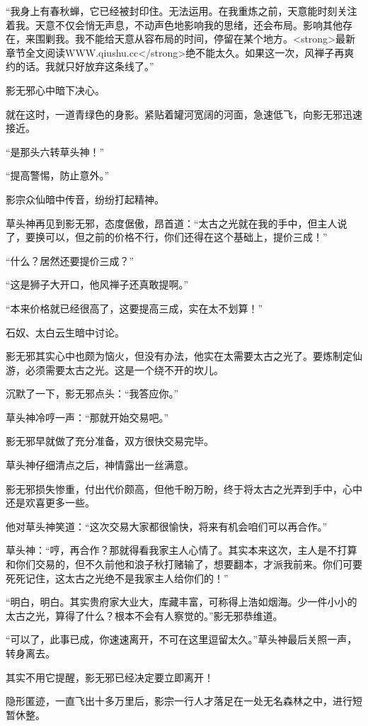 \begin{this_body}
“我身上有春秋蝉，它已经被封印住。无法运用。在我重炼之前，天意能时刻关注着我。天意不仅会悄无声息，不动声色地影响我的思绪，还会布局。影响其他存在，来围剿我。我不能给天意从容布局的时间，停留在某个地方。<strong>最新章节全文阅读WWW.qiushu.cc</strong>绝不能太久。如果这一次，风禅子再爽约的话。我就只好放弃这条线了。”

影无邪心中暗下决心。

就在这时，一道青绿色的身影。紧贴着罐河宽阔的河面，急速低飞，向影无邪迅速接近。

“是那头六转草头神！”

“提高警惕，防止意外。”

影宗众仙暗中传音，纷纷打起精神。

草头神再见到影无邪，态度倨傲，昂首道：“太古之光就在我的手中，但主人说了，要换可以，但之前的价格不行，你们还得在这个基础上，提价三成！”

“什么？居然还要提价三成？”

“这是狮子大开口，他风禅子还真敢提啊。”

“本来价格就已经很高了，这要提高三成，实在太不划算！”

石奴、太白云生暗中讨论。

影无邪其实心中也颇为恼火，但没有办法，他实在太需要太古之光了。要炼制定仙游，必须需要太古之光。这是一个绕不开的坎儿。

沉默了一下，影无邪点头：“我答应你。”

草头神冷哼一声：“那就开始交易吧。”

影无邪早就做了充分准备，双方很快交易完毕。

草头神仔细清点之后，神情露出一丝满意。

影无邪损失惨重，付出代价颇高，但他千盼万盼，终于将太古之光弄到手中，心中还是欢喜更多一些。

他对草头神笑道：“这次交易大家都很愉快，将来有机会咱们可以再合作。”

草头神：“哼，再合作？那就得看我家主人心情了。其实本来这次，主人是不打算和你们交易的，但不久前他和浪子秋打赌输了，想要翻本，才派我前来。你们可要死死记住，这太古之光绝不是我家主人给你们的！”

“明白，明白。其实贵府家大业大，库藏丰富，可称得上浩如烟海。少一件小小的太古之光，算得了什么？根本不会有人察觉的。”影无邪恭维道。

“可以了，此事已成，你速速离开，不可在这里逗留太久。”草头神最后关照一声，转身离去。

其实不用它提醒，影无邪已经决定要立即离开！

隐形匿迹，一直飞出十多万里后，影宗一行人才落足在一处无名森林之中，进行短暂休整。


\end{this_body}
